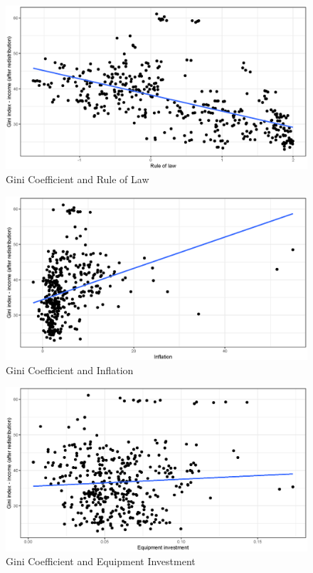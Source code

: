 \documentclass[a4paper,11pt]{article}
\begin{document}
\begin{figure}
    \caption{Gini Coefficient and Rule of Law}
    \label{fig:ginirule}
\includegraphics[width=\textwidth, keepaspectratio]{figures/RuleLawGiniNet}
\end{figure}

\begin{figure}
    \caption{Gini Coefficient and Inflation}
    \label{fig:giniinfl}
\includegraphics[width=\textwidth, keepaspectratio]{figures/InflGiniNet}
\end{figure}

\begin{figure}
    \caption{Gini Coefficient and Equipment Investment}
    \label{fig:giniequipi}
\includegraphics[width=\textwidth, keepaspectratio]{figures/EquipIGiniNet}
\end{figure}
\end{document}
